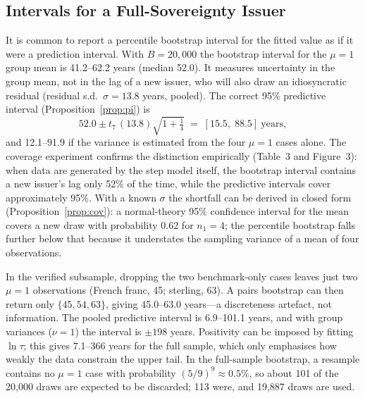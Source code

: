 \documentclass[11pt,letterpaper]{article}
\theoremstyle{definition}
\theoremstyle{plain}
\begin{document}
\subsection{Intervals for a Full-Sovereignty Issuer}\label{sec:intervals}
It is common to report a percentile bootstrap interval for the fitted value as if it were a prediction interval. With $B=20{,}000$ the bootstrap interval for the $\mu=1$ group mean is 41.2--62.2 years (median 52.0). It measures uncertainty in the group mean, not in the lag of a new issuer, who will also draw an idiosyncratic residual (residual s.d.\ $\hat\sigma=13.8$ years, pooled). The correct 95\% predictive interval (Proposition~\ref{prop:pi}) is
\[
52.0\pm t_{7}\,(13.8)\sqrt{1+\tfrac14}\;=\;[15.5,\;88.5]\ \text{years},
\]
and 12.1--91.9 if the variance is estimated from the four $\mu=1$ cases alone. The coverage experiment confirms the distinction empirically (Table~3 and Figure~3): when data are generated by the step model itself, the bootstrap interval contains a new issuer's lag only 52\% of the time, while the predictive intervals cover approximately 95\%. With a known $\sigma$ the shortfall can be derived in closed form (Proposition~\ref{prop:cov}): a normal-theory 95\% confidence interval for the mean covers a new draw with probability 0.62 for $n_1=4$; the percentile bootstrap falls further below that because it understates the sampling variance of a mean of four observations.

In the verified subsample, dropping the two benchmark-only cases leaves just two $\mu=1$ observations (French franc, 45; sterling, 63). A pairs bootstrap can then return only $\{45,54,63\}$, giving 45.0--63.0 years---a discreteness artefact, not information. The pooled predictive interval is 6.9--101.1 years, and with group variances ($\nu=1$) the interval is $\pm198$ years. Positivity can be imposed by fitting $\ln\tau$; this gives 7.1--366 years for the full sample, which only emphasises how weakly the data constrain the upper tail. In the full-sample bootstrap, a resample contains no $\mu=1$ case with probability $(5/9)^9\approx0.5\%$, so about 101 of the 20,000 draws are expected to be discarded; 113 were, and 19,887 draws are used.
\end{document}
